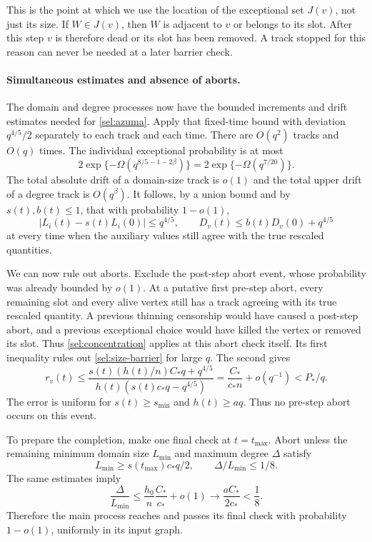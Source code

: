 This is the point at which we use the location of the exceptional
set $J(v)$, not just its size.  If $W\in J(v)$, then $W$ is adjacent
to $v$ or belongs to its slot.  After this step $v$ is therefore dead
or its slot has been removed.  A track stopped for this reason can
never be needed at a later barrier check.

\paragraph{Simultaneous estimates and absence of aborts.}
The domain and degree processes now have the bounded increments and
drift estimates needed for \eqref{sel:azuma}.  Apply that fixed-time
bound with deviation $q^{4/5}/2$ separately to each track and each
time.  There are $O(q^2)$ tracks and $O(q)$ times.
The individual exceptional probability is at most
\[
 2\exp\{-\Omega(q^{8/5-1-2\beta})\}
 =2\exp\{-\Omega(q^{7/20})\}.
\]
The total absolute drift of a domain-size track is $o(1)$ and
the total upper drift of a degree track is $O(q^\beta)$.
It follows, by a union bound and by $s(t),b(t)\le1$, that with
probability $1-o(1)$,
\begin{equation}\label{sel:concentration}
 |L_i(t)-s(t)L_i(0)|\le q^{4/5},\qquad
 D_v(t)\le b(t)D_v(0)+q^{4/5}
\end{equation}
at every time when the auxiliary values still agree with the true
rescaled quantities.

We can now rule out aborts.  Exclude the post-step abort event, whose
probability was already bounded by $o(1)$.  At a putative first
pre-step abort, every remaining slot and every alive vertex still has
a track agreeing with its true rescaled quantity.  A previous thinning
censorship would have caused a post-step abort, and a previous
exceptional choice would have killed the vertex or removed its slot.
Thus \eqref{sel:concentration} applies at this abort check itself.
Its first inequality rules out \eqref{sel:size-barrier} for large $q$.
The second gives
\begin{equation}\label{sel:hazard-barrier}
 r_v(t)
 \le \frac{s(t)(h(t)/n)C_*q+q^{4/5}}
              {h(t)(s(t)c_*q-q^{4/5})}
 =\frac{C_*}{c_*n}+o(q^{-1})<P_*/q.
\end{equation}
The error is uniform for $s(t)\ge s_{\min}$ and $h(t)\ge aq$.
Thus no pre-step abort occurs on this event.

To prepare the completion, make one final check at $t=t_{\max}$.
Abort unless the remaining minimum domain size $L_{\min}$ and maximum
degree $\Delta$ satisfy
\begin{equation}\label{sel:tail-check}
 L_{\min}\ge s(t_{\max})c_*q/2,
 \qquad \Delta/L_{\min}\le1/8.
\end{equation}
The same estimates imply
\[
 \frac{\Delta}{L_{\min}}
 \le\frac{h_0}{n}\frac{C_*}{c_*}+o(1)
 \longrightarrow \frac{aC_*}{2c_*}<\frac18.
\]
Therefore the main process reaches and passes its final check with
probability $1-o(1)$, uniformly in its input graph.

